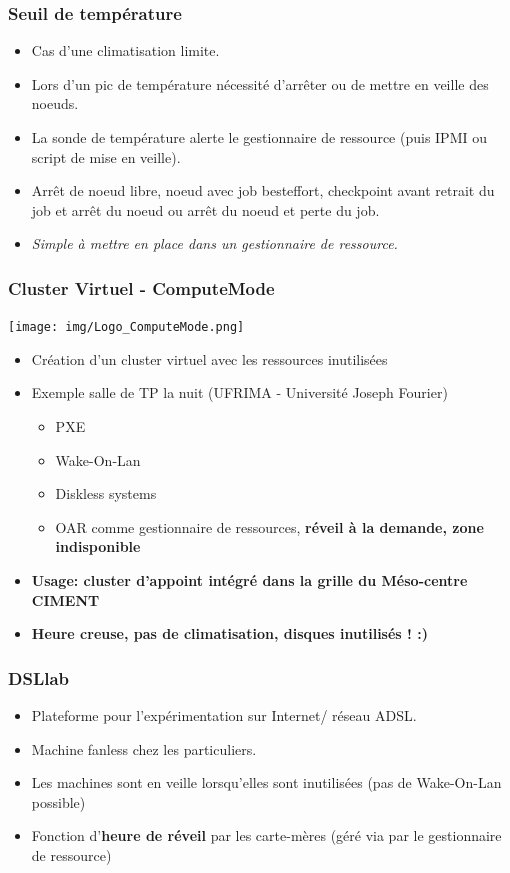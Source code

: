 \documentclass{beamer}
\begin{document}
\begin{frame}
  \frametitle{Seuil de température}
  \begin{itemize}
		\item Cas d'une climatisation limite.
    \item Lors d'un pic de température nécessité d'arrêter ou de mettre en veille des noeuds.
    \item La sonde de température alerte le gestionnaire de ressource (puis IPMI ou script de mise en veille).
    \item Arrêt de noeud libre, noeud avec job besteffort, checkpoint avant retrait du job et arrêt du noeud ou arrêt du noeud et perte du job.
    \item {\em Simple à mettre en place dans un gestionnaire de ressource.}
  \end{itemize}
\end{frame}

\begin{frame}
  \frametitle{Cluster Virtuel - ComputeMode}
  \texttt{[image: img/Logo\_ComputeMode.png]}

  \begin{itemize}
		\item Création d'un cluster virtuel avec les ressources inutilisées
    \item Exemple salle de TP la nuit (UFRIMA - Université Joseph Fourier)
    \begin{itemize}
      \item PXE
      \item Wake-On-Lan
      \item Diskless systems
      \item OAR comme gestionnaire de ressources, {\bf réveil à la demande, zone indisponible}
    \end{itemize}
    \item {\bf Usage: cluster d'appoint intégré dans la grille du Méso-centre CIMENT }
    \item {\bf Heure creuse, pas de climatisation, disques inutilisés ! :) }
  \end{itemize}

\end{frame}

\begin{frame}
  \frametitle{DSLlab}
  \begin{itemize}
		\item Plateforme pour l'expérimentation sur Internet/ réseau ADSL.
    \item Machine fanless chez les particuliers.
    \item Les machines sont en veille lorsqu'elles sont inutilisées (pas de  Wake-On-Lan
possible)
     \item Fonction d'{\bf heure de réveil} par les carte-mères (géré via par le gestionnaire de ressource) 
  \end{itemize}
\end{frame}
\end{document}
